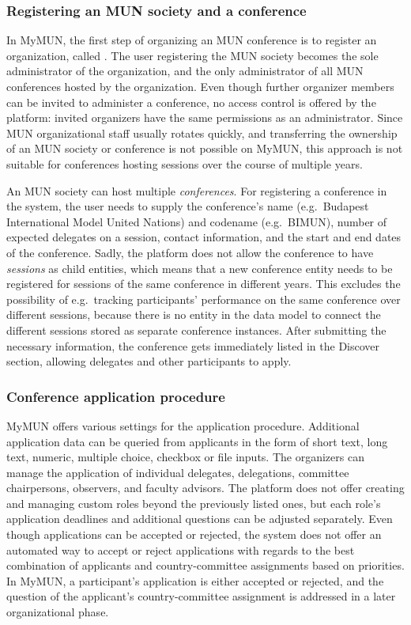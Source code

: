 \subsubsection{Registering an MUN society and a conference}

In MyMUN, the first step of organizing an MUN conference is to register an organization, called . The user registering the MUN society becomes the sole administrator of the organization, and the only administrator of all MUN conferences hosted by the organization. Even though further organizer members can be invited to administer a conference, no access control is offered by the platform: invited organizers have the same permissions as an administrator. Since MUN organizational staff usually rotates quickly, and transferring the ownership of an MUN society or conference is not possible on MyMUN, this approach is not suitable for conferences hosting sessions over the course of multiple years.

An MUN society can host multiple \emph{conferences}. For registering a conference in the system, the user needs to supply the conference's name (e.g.\ Budapest International Model United Nations) and codename (e.g.\ BIMUN), number of expected delegates on a session, contact information, and the start and end dates of the conference. Sadly, the platform does not allow the conference to have \emph{sessions} as child entities, which means that a new conference entity needs to be registered for sessions of the same conference in different years. This excludes the possibility of e.g.\ tracking participants' performance on the same conference over different sessions, because there is no entity in the data model to connect the different sessions stored as separate conference instances. After submitting the necessary information, the conference gets immediately listed in the Discover section, allowing delegates and other participants to apply.

\subsubsection{Conference application procedure}

MyMUN offers various settings for the application procedure. Additional application data can be queried from applicants in the form of short text, long text, numeric, multiple choice, checkbox or file inputs. The organizers can manage the application of individual delegates, delegations, committee chairpersons, observers, and faculty advisors. The platform does not offer creating and managing custom roles beyond the previously listed ones, but each role's application deadlines and additional questions can be adjusted separately. Even though applications can be accepted or rejected, the system does not offer an automated way to accept or reject applications with regards to the best combination of applicants and country-committee assignments based on priorities. In MyMUN, a participant's application is either accepted or rejected, and the question of the applicant's country-committee assignment is addressed in a later organizational phase.

